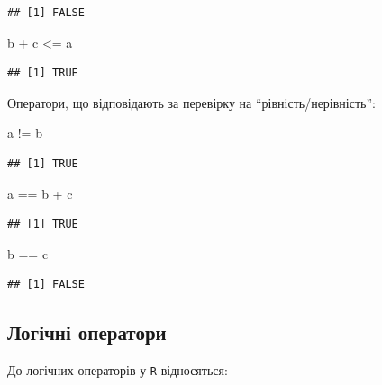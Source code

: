 \documentclass[
]{book}
\newenvironment{Shaded}{\begin{snugshade}}{\end{snugshade}}
\newcommand{\NormalTok}[1]{#1}
\newcommand{\SpecialCharTok}[1]{\textcolor[rgb]{0.00,0.00,0.00}{#1}}
\begin{document}
\begin{verbatim}
## [1] FALSE
\end{verbatim}

\begin{Shaded}
\begin{Highlighting}[]
\NormalTok{b }\SpecialCharTok{+}\NormalTok{ c }\SpecialCharTok{\textless{}=}\NormalTok{ a}
\end{Highlighting}
\end{Shaded}

\begin{verbatim}
## [1] TRUE
\end{verbatim}

Оператори, що відповідають за перевірку на ``рівність/нерівність'':

\begin{Shaded}
\begin{Highlighting}[]
\NormalTok{a }\SpecialCharTok{!=}\NormalTok{ b}
\end{Highlighting}
\end{Shaded}

\begin{verbatim}
## [1] TRUE
\end{verbatim}

\begin{Shaded}
\begin{Highlighting}[]
\NormalTok{a }\SpecialCharTok{==}\NormalTok{ b }\SpecialCharTok{+}\NormalTok{ c}
\end{Highlighting}
\end{Shaded}

\begin{verbatim}
## [1] TRUE
\end{verbatim}

\begin{Shaded}
\begin{Highlighting}[]
\NormalTok{b }\SpecialCharTok{==}\NormalTok{ c}
\end{Highlighting}
\end{Shaded}

\begin{verbatim}
## [1] FALSE
\end{verbatim}

\hypertarget{chapter233}{%
\subsection{Логічні оператори}\label{chapter233}}

До логічних операторів у \texttt{R} відносяться:
\end{document}
